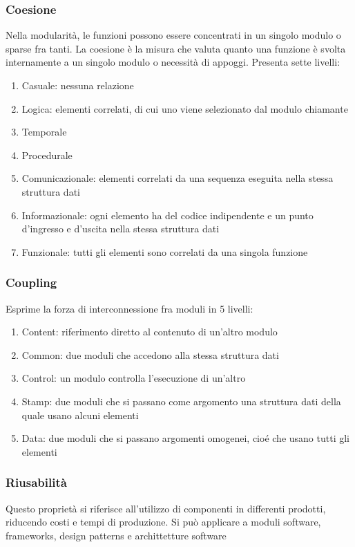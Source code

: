 \documentclass[12pt, a4paper]{article}
\begin{document}
\subsubsection{Coesione}
Nella modularità, le funzioni possono essere concentrati in un singolo modulo o sparse fra tanti. La 
coesione è la misura che valuta quanto una funzione è svolta internamente a un singolo modulo o necessità 
di appoggi. Presenta sette livelli:
\begin{enumerate}
    \item Casuale: nessuna relazione
    \item Logica: elementi correlati, di cui uno viene selezionato dal modulo chiamante
    \item Temporale
    \item Procedurale
    \item Comunicazionale: elementi correlati da una sequenza eseguita nella stessa struttura dati
    \item Informazionale: ogni elemento ha del codice indipendente e un punto d'ingresso e d'uscita nella 
    stessa struttura dati
    \item Funzionale: tutti gli elementi sono correlati da una singola funzione
\end{enumerate}

\subsubsection{Coupling}
Esprime la forza di interconnessione fra moduli in 5 livelli:
\begin{enumerate}
    \item Content: riferimento diretto al contenuto di un'altro modulo
    \item Common: due moduli che accedono alla stessa struttura dati
    \item Control: un modulo controlla l'esecuzione di un'altro
    \item Stamp: due moduli che si passano come argomento una struttura dati della quale usano alcuni elementi
    \item Data: due moduli che si passano argomenti omogenei, cioé che usano tutti gli elementi
\end{enumerate}

\subsubsection{Riusabilità}
Questo proprietà si riferisce all'utilizzo di componenti in differenti prodotti, riducendo costi e tempi di 
produzione. Si può applicare a moduli software, frameworks, design patterns e archittetture software
\end{document}
